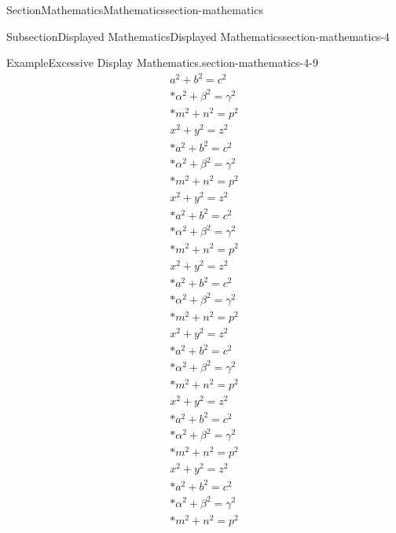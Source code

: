 \documentclass[twoside,10pt,]{article}
\numberwithin{equation}{section}
\begin{document}
\begin{sectionptx}{Section}{Mathematics}{}{Mathematics}{}{}{section-mathematics}
\begin{subsectionptx}{Subsection}{Displayed Mathematics}{}{Displayed Mathematics}{}{}{section-mathematics-4}
\begin{example}{Example}{Excessive Display Mathematics.}{section-mathematics-4-9}
\begin{gather}
a^2+b^2=c^2\label{section-mathematics-4-9-3-2-14}\\*
\alpha^2+\beta^2=\gamma^2\label{section-mathematics-4-9-3-2-15}\\*
m^2+n^2=p^2\label{section-mathematics-4-9-3-2-16}\\
x^2+y^2=z^2\label{section-mathematics-4-9-3-2-17}\\*
a^2+b^2=c^2\label{section-mathematics-4-9-3-2-18}\\*
\alpha^2+\beta^2=\gamma^2\label{section-mathematics-4-9-3-2-19}\\*
m^2+n^2=p^2\label{section-mathematics-4-9-3-2-20}\\
x^2+y^2=z^2\label{section-mathematics-4-9-3-2-21}\\*
a^2+b^2=c^2\label{section-mathematics-4-9-3-2-22}\\*
\alpha^2+\beta^2=\gamma^2\label{section-mathematics-4-9-3-2-23}\\*
m^2+n^2=p^2\label{section-mathematics-4-9-3-2-24}\\
x^2+y^2=z^2\label{section-mathematics-4-9-3-2-25}\\*
a^2+b^2=c^2\label{section-mathematics-4-9-3-2-26}\\*
\alpha^2+\beta^2=\gamma^2\label{section-mathematics-4-9-3-2-27}\\*
m^2+n^2=p^2\label{section-mathematics-4-9-3-2-28}\\
x^2+y^2=z^2\label{section-mathematics-4-9-3-2-29}\\*
a^2+b^2=c^2\label{section-mathematics-4-9-3-2-30}\\*
\alpha^2+\beta^2=\gamma^2\label{section-mathematics-4-9-3-2-31}\\*
m^2+n^2=p^2\label{section-mathematics-4-9-3-2-32}\\
x^2+y^2=z^2\label{section-mathematics-4-9-3-2-33}\\*
a^2+b^2=c^2\label{section-mathematics-4-9-3-2-34}\\*
\alpha^2+\beta^2=\gamma^2\label{section-mathematics-4-9-3-2-35}\\*
m^2+n^2=p^2\label{section-mathematics-4-9-3-2-36}\\
x^2+y^2=z^2\label{section-mathematics-4-9-3-2-37}\\*
a^2+b^2=c^2\label{section-mathematics-4-9-3-2-38}\\*
\alpha^2+\beta^2=\gamma^2\label{section-mathematics-4-9-3-2-39}\\*
m^2+n^2=p^2\label{section-mathematics-4-9-3-2-40}\\

\end{gather}
\end{example}
\end{subsectionptx}
\end{sectionptx}
\end{document}
